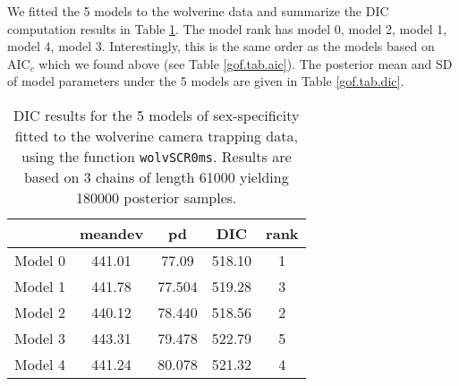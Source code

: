 We fitted the 5 models to the wolverine data and summarize
the DIC computation results in Table \ref{gof.tab.DIC}. 
The model rank has model 0, model 2, model 1, model 4, model 3.
Interestingly, this is the same order as the models based on AIC$_c$
which we found above
(see Table \ref{gof.tab.aic}).
The posterior mean and SD of model parameters under the 5 models are
given in Table \ref{gof.tab.dic}. 

\begin{table}[ht]
\centering
\caption{
DIC results for the 5 models of sex-specificity fitted to the
wolverine camera trapping data, using the function
\mbox{\tt wolvSCR0ms}. Results are based on 3 chains of length 61000
yielding 180000 posterior samples. 
}
\begin{tabular}{ccccc} \hline \hline
      &  meandev  &  pd   &    DIC  &   rank \\ \hline
Model 0&  441.01 & 77.09&518.10&    1 \\
Model 1& 441.78 &77.504 &519.28&    3\\
Model 2& 440.12 &78.440 &518.56&    2\\
Model 3& 443.31 &79.478 &522.79&    5\\
Model 4& 441.24 &80.078 &521.32&    4\\
\end{tabular}
\label{gof.tab.DIC}
\end{table}

\begin{comment}
\begin{verbatim}
DIC info (using the rule, pD = var(deviance)/2)
pD = 80.1 and DIC = 521.3
DIC is an estimate of expected predictive error (lower deviance is better).
            mean    sd   mean    sd   mean    sd   mean    sd   mean    sd
D           5.79  1.15   5.81  1.15   5.72  1.15   5.75  1.15   5.66  1.13
N          60.02 11.91  60.24 11.93  59.37 11.97  59.67 11.97  58.77 11.75
alpha0     -2.81  0.18  -2.82  0.17  -2.44  0.25  -2.82  0.18  -2.43  0.25
alpha.sex   0.00  1.73   0.00  1.73  -0.75  0.34   0.00  1.73  -0.79  0.36
%%beta        1.25  0.21   1.26  0.21   1.19  0.21   1.24  0.29   1.30  0.32
beta.sex    0.00  1.73  -0.01  1.73   0.01  1.74  -0.01  0.17   0.10  0.18
sigma0       0.64  0.06   0.64  0.05   0.66  0.06   0.65  0.08   0.63  0.09
psi         0.30  0.07   0.30  0.07   0.30  0.07   0.30  0.07   0.30  0.07
psi.sex     0.50  0.29   0.52  0.10   0.56  0.10   0.52  0.11   0.54  0.11
deviance  441.01 12.42 441.78 12.45 440.12 12.53 443.31 12.61 441.24 12.66
\end{verbatim}
\end{comment}

